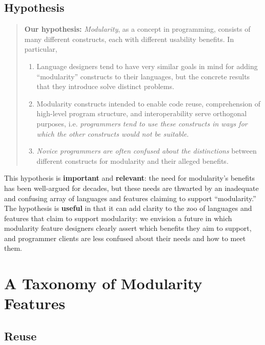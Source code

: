 \documentclass{sigplanconf}[10pt]
\begin{document}
\subsection{Hypothesis}

\begin{quote}
  {\bf Our hypothesis:}
  {\em Modularity}, as a concept in programming, consists of many different
  constructs, each with different usability benefits. In particular,
  \begin{enumerate}
    \item Language designers tend to have very similar goals in mind for
      adding ``modularity'' constructs to their languages, but the concrete
      results that they introduce solve distinct problems.
    \item Modularity constructs intended to enable code reuse,
      comprehension of high-level program structure, and interoperability
      serve orthogonal purposes, i.e. {\em programmers tend to use these
      constructs in ways for which the other constructs would not be
      suitable}.
    \item {\em Novice programmers are often confused about the
      distinctions} between different constructs for modularity and their
      alleged benefits. 
  \end{enumerate}
\end{quote}

This hypothesis is {\bf important} and {\bf relevant}: the need for
modularity's benefits has been well-argued for decades, but these needs are
thwarted by an inadequate and confusing array of languages and features
claiming to support ``modularity.'' The hypothesis is {\bf useful} in that
it can add clarity to the zoo of languages and features that claim to
support modularity: we envision a future in which modularity feature
designers clearly assert which benefits they aim to support, and programmer
clients are less confused about their needs and how to meet them. 
 


\section{A Taxonomy of Modularity Features}

\subsection{Reuse}
\end{document}
